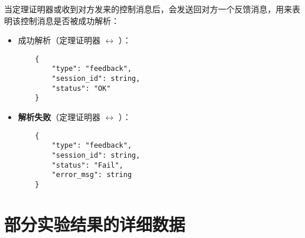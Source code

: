 当定理证明器或收到对方发来的控制消息后，会发送回对方一个反馈消息，用来表明该控制消息是否被成功解析：
\begin{itemize}
	\item \textsf{成功解析}（定理证明器 $\longleftrightarrow$ ）：
	\begin{verbatim}
	{
	    "type": "feedback",
	    "session_id": string,
	    "status": "OK"
	}
	\end{verbatim}
	\item \textbf{解析失败}（定理证明器 $\longleftrightarrow$ ）：
	\begin{verbatim}
	{
	    "type": "feedback",
	    "session_id": string,
	    "status": "Fail",
	    "error_msg": string
	}
	\end{verbatim}
\end{itemize}
\cleardoublepage
\chapter{部分实验结果的详细数据}\label{appendix:detail:data}

